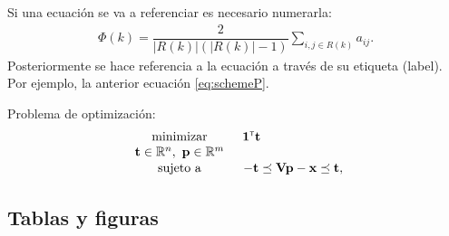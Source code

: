 \documentclass[12pt,twoside,titlepage]{report}
\newcommand{\transpuesta}{\mbox{\tiny $\mathsf{T}$}}
\begin{document}
Si una ecuación se va a referenciar es necesario numerarla:
\begin{eqnarray}
\label{eq:schemeP}
 \Phi (k)=\dfrac{2}{|R(k)|(|R(k)|-1)} \underset{i,j \in R(k)}{\sum} a_{ij}.
\end{eqnarray}
Posteriormente se hace referencia a la ecuación a través de su etiqueta (label). Por ejemplo, la anterior ecuación \eqref{eq:schemeP}.



Problema de optimización:
\begin{equation}\label{eq:LP1}
\begin{array}{cl}
  \displaystyle \begin{array}{c}\mathrm{minimizar} \\ \mathbf{t} \in \mathbb{R}^{n}, \  \mathbf{p} \in \mathbb{R}^{m} \end{array} & \hspace{-0.2cm} \begin{array}{c} \mathbf{1}^{\transpuesta}\mathbf{t} \\ \mbox{} \end{array}  \\
  & \vspace{-0.4cm} \\ %
  \mbox{sujeto a} & -\mathbf{t} \preceq  \mathbf{V}\mathbf{p} - \mathbf{x}  \preceq  \mathbf{t},\\
 \end{array}
\end{equation}




\subsection{Tablas y figuras}
\end{document}
